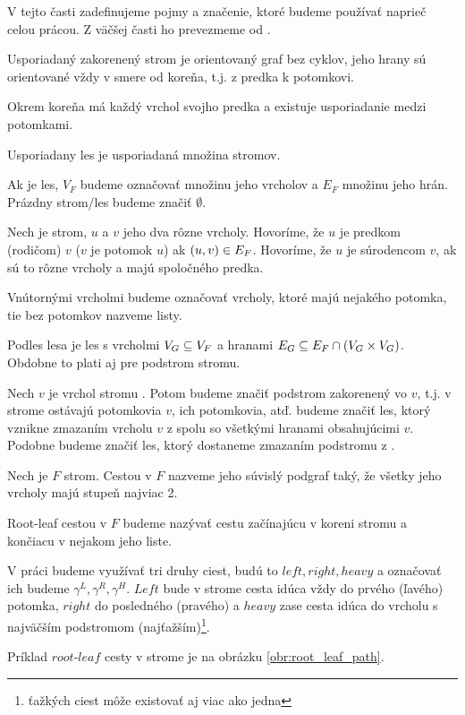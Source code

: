 V tejto časti zadefinujeme pojmy a značenie, ktoré budeme používať naprieč celou prácou.
Z väčšej časti ho prevezmeme od \citet{RTED}.

\begin{definice}\label{def:strom}
  Usporiadaný zakorenený strom je orientovaný graf bez cyklov,
  jeho hrany sú orientované vždy v smere od koreňa, t.j. z predka k potomkovi.

  Okrem koreňa má každý vrchol svojho predka a existuje usporiadanie medzi potomkami.

  Usporiadany les je usporiadaná množina stromov.
\end{definice}

Ak  je les, $V_F$ budeme označovať množinu jeho vrcholov a $E_F$ množinu jeho hrán.
Prázdny strom/les budeme značiť $\emptyset$.

\begin{definice}
  \label{def:stromove_pojmy}
  Nech  je strom, $u$ a $v$ jeho dva rôzne vrcholy.
  Hovoríme, že $u$ je predkom (rodičom) $v$ ($v$ je potomok $u$) ak $(u, v) \in E_{F}$.
  Hovoríme, že $u$ je súrodencom $v$, ak sú to rôzne vrcholy a majú spoločného predka.
\end{definice}

Vnútornými vrcholmi budeme označovať vrcholy, ktoré majú nejakého potomka,
tie bez potomkov nazveme listy.

Podles lesa  je les  s vrcholmi $V_{G} \subseteq V_{F}$
a hranami $E_{G} \subseteq E_{F} \cap (V_{G} \times V_{G})$.
Obdobne to plati aj pre podstrom stromu.

Nech $v$ je vrchol stromu . Potom  budeme značiť podstrom  zakorenený vo $v$,
t.j. v strome ostávajú potomkovia $v$, ich potomkovia, atď.
 budeme značiť les, ktorý vznikne zmazaním vrcholu $v$ z  spolu so
všetkými hranami obsahujúcimi $v$. Podobne  budeme značiť les, ktorý
dostaneme zmazaním podstromu  z .

\begin{definice}
  Nech je $F$ strom. Cestou v $F$ nazveme jeho súvislý podgraf taký, že všetky jeho vrcholy
  majú stupeň najviac 2.

  Root-leaf cestou v $F$ budeme nazývať cestu začínajúcu v koreni stromu a \mbox{končiacu}
  v nejakom jeho liste.
\end{definice}

V práci budeme využívať tri druhy ciest, budú to $left, right, heavy$ a označovať ich
budeme $\gamma^L, \gamma^R, \gamma^H$. $Left$ bude v strome cesta idúca vždy do prvého (ľavého)
potomka, $right$ do posledného (pravého) a $heavy$ zase cesta idúca do vrcholu s najväčším
podstromom (najťažším)\footnote{ťažkých ciest môže existovať aj viac ako jedna}.

Príklad $root$-$leaf$ cesty v strome je na obrázku \ref{obr:root_leaf_path}.




